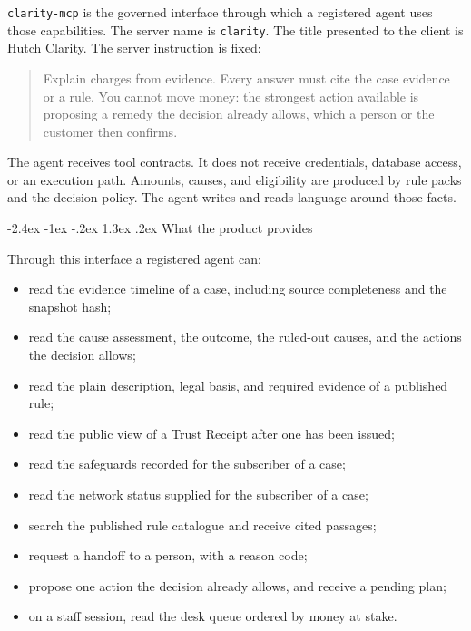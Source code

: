 \documentclass[11pt,a4paper]{article}
\makeatletter
\renewcommand\section{%
  \@startsection{section}{1}{\z@}%
    {-2.4ex \@plus -1ex \@minus -.2ex}%
    {1.3ex \@plus .2ex}%
    {\Large\sffamily\bfseries\color{hcNavy}}%
}
\newcommand{\code}[1]{\texttt{#1}}
\makeatother
\begin{document}
\code{clarity-mcp} is the governed interface through which a registered agent uses those capabilities. The server name is \code{clarity}. The title presented to the client is Hutch Clarity. The server instruction is fixed:

\begin{quote}
\sffamily\color{hcInk}
Explain charges from evidence. Every answer must cite the case evidence or a rule. You cannot move money: the strongest action available is proposing a remedy the decision already allows, which a person or the customer then confirms.
\end{quote}

The agent receives tool contracts. It does not receive credentials, database access, or an execution path. Amounts, causes, and eligibility are produced by rule packs and the decision policy. The agent writes and reads language around those facts.

\section{What the product provides}

Through this interface a registered agent can:

\begin{itemize}
  \item read the evidence timeline of a case, including source completeness and the snapshot hash;
  \item read the cause assessment, the outcome, the ruled-out causes, and the actions the decision allows;
  \item read the plain description, legal basis, and required evidence of a published rule;
  \item read the public view of a Trust Receipt after one has been issued;
  \item read the safeguards recorded for the subscriber of a case;
  \item read the network status supplied for the subscriber of a case;
  \item search the published rule catalogue and receive cited passages;
  \item request a handoff to a person, with a reason code;
  \item propose one action the decision already allows, and receive a pending plan;
  \item on a staff session, read the desk queue ordered by money at stake.
\end{itemize}
\end{document}
